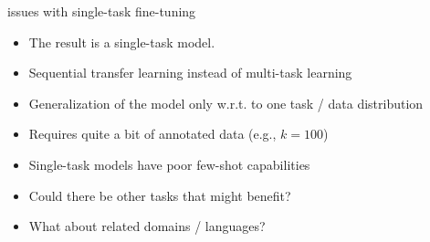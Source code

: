 
\begin{frame}{issues with single-task fine-tuning}

\vfill

\begin{itemize}
    \item The result is a single-task model.
\item Sequential transfer learning instead of multi-task learning
    \item Generalization of the model 
             only w.r.t. to one task / data distribution
    \item Requires quite a bit of annotated
        data (e.g., $k=100$)
    \item Single-task models have poor few-shot capabilities
            \item \ques Could there be other tasks that
        might benefit?
            \item \ques What about related domains / languages?
\end{itemize}

\vfill

\end{frame}

